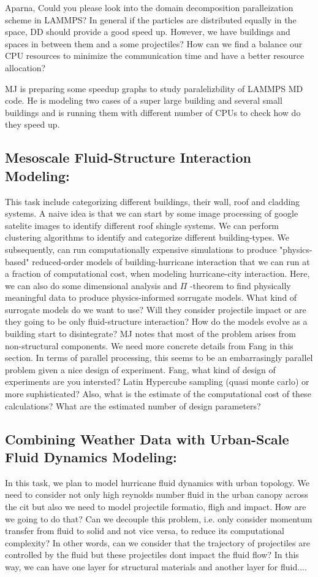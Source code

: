 \documentclass{proposalnsf}
\begin{document}
Aparna, Could you please look into the domain decomposition paralleization scheme in LAMMPS? In general if the particles are distributed equally in the space, DD should provide a good speed up. However, we have buildings and spaces in between them and a some projectiles? How can we find a balance our CPU resources to minimize the communication time and have a better resource allocation?

MJ is preparing some speedup graphs to study paralelizbility of LAMMPS MD code. He is modeling two cases of a super large building and several small buildings and is running them with different number of CPUs to check how do they speed up.

\subsection{Mesoscale Fluid-Structure Interaction Modeling:} This task include categorizing different buildings, their wall, roof and cladding systems. A naive idea is that we can start by some image processing of google satelite images to identify different roof shingle systems. We can perform clustering algorithms to identify and categorize different building-types. We subsequently, can run computationally expensive simulations to produce "physics-based" reduced-order models of building-hurricane interaction that we can run at a fraction of computational cost, when modeling hurricane-city interaction. Here, we can also do some dimensional analysis and $\Pi$ -theorem to find physically meaningful data to produce physics-informed sorrugate models. What kind of surrogate models do we want to use? Will they consider projectile impact or are they going to be only fluid-structure interaction? How do the models evolve as a building start to disintegrate? MJ  notes that most of the problem arises from non-structural components. We need more concrete details from Fang in this section. In terms of parallel processing, this seems to be an embarrasingly parallel problem given a nice design of experiment. Fang, what kind of design of experiments are you intersted? Latin Hypercube sampling (quasi monte carlo) or more suphisticated? Also, what is the estimate of the computational cost of these calculations? What are the estimated number of design parameters?
 
\subsection{Combining Weather Data with Urban-Scale Fluid Dynamics Modeling:} In this task, we plan to model hurricane fluid dynamics with urban topology. We need to consider not only high reynolds number fluid in the urban canopy across the cit but also we need to model projectile formatio, fligh and impact. How are we going to do that? Can we decouple this problem, i.e. only consider momentum transfer from fluid to solid and not vice versa, to reduce its computational complexity? In other words, can we consider that the trajectory of projectiles are controlled by the fluid but these projectiles dont impact the fluid flow? In this way, we can have one layer for structural materials and another layer for fluid....
\end{document}
